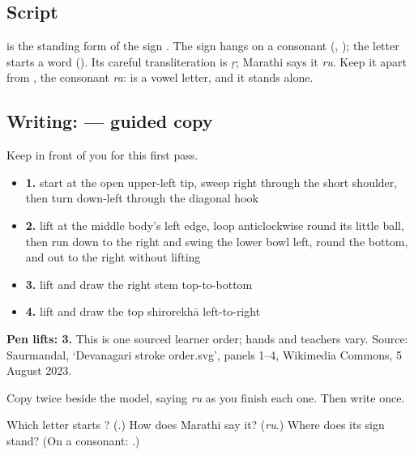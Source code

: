 \subsection*{Script}
\begin{quote}
\end{quote}

\textbf{} is the standing form of the sign \textbf{}. The sign hangs on a consonant (\textbf{}, \textbf{}); the letter starts a word (\textbf{}). Its careful transliteration is \emph{ṛ}; Marathi says it \emph{ru}. Keep it apart from \textbf{}, the consonant \emph{ra}: \textbf{} is a vowel letter, and it stands alone.

\subsection*{Writing:  — guided copy}

Keep \textbf{} in front of you for this first pass.

\begin{itemize}
\raggedright
  \item \textbf{1.} start at the open upper-left tip, sweep right through the short shoulder, then turn down-left through the diagonal hook
  \item \textbf{2.} lift at the middle body's left edge, loop anticlockwise round its little ball, then run down to the right and swing the lower bowl left, round the bottom, and out to the right without lifting
  \item \textbf{3.} lift and draw the right stem top-to-bottom
  \item \textbf{4.} lift and draw the top shirorekhā left-to-right
\end{itemize}

\textbf{Pen lifts: 3.} This is one sourced learner order; hands and teachers vary. Source: Saurmandal, ‘Devanagari  stroke order.svg’, panels 1–4, Wikimedia Commons, 5 August 2023.

Copy \textbf{} twice beside the model, saying \emph{ru} as you finish each one. Then write \textbf{} once.

\begin{tcolorbox}[breakable,colback=teal!4,colframe=teal!35!black,title={Before you move on}]
Which letter starts \textbf{}? (\textbf{}.) How does Marathi say it? (\emph{ru}.) Where does its sign \textbf{} stand? (On a consonant: \textbf{}.)
\end{tcolorbox}
